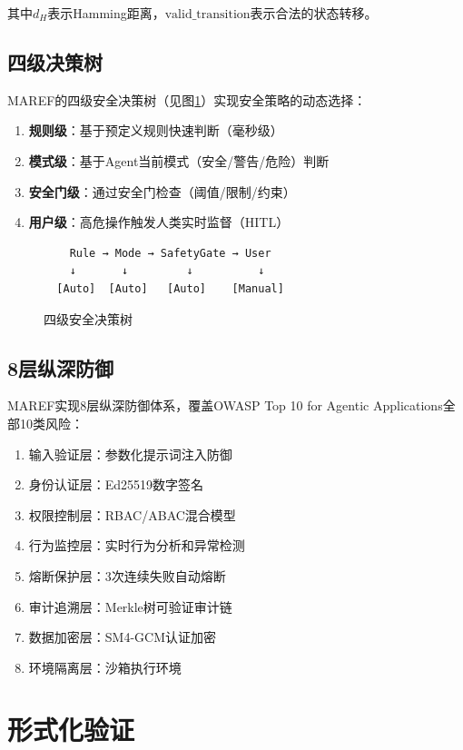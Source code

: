 其中$d_H$表示Hamming距离，$\text{valid\_transition}$表示合法的状态转移。

\subsection{四级决策树}

MAREF的四级安全决策树（见图\ref{fig:decision}）实现安全策略的动态选择：

\begin{enumerate}
    \item \textbf{规则级}：基于预定义规则快速判断（毫秒级）
    \item \textbf{模式级}：基于Agent当前模式（安全/警告/危险）判断
    \item \textbf{安全门级}：通过安全门检查（阈值/限制/约束）
    \item \textbf{用户级}：高危操作触发人类实时监督（HITL）
\end{enumerate}

\begin{figure}[htbp]
\centering
\begin{verbatim}
    Rule → Mode → SafetyGate → User
    ↓       ↓         ↓          ↓
  [Auto]  [Auto]   [Auto]    [Manual]
\end{verbatim}
\caption{四级安全决策树}
\label{fig:decision}
\end{figure}

\subsection{8层纵深防御}

MAREF实现8层纵深防御体系，覆盖OWASP Top 10 for Agentic Applications全部10类风险：

\begin{enumerate}
    \item 输入验证层：参数化提示词注入防御
    \item 身份认证层：Ed25519数字签名
    \item 权限控制层：RBAC/ABAC混合模型
    \item 行为监控层：实时行为分析和异常检测
    \item 熔断保护层：3次连续失败自动熔断
    \item 审计追溯层：Merkle树可验证审计链
    \item 数据加密层：SM4-GCM认证加密
    \item 环境隔离层：沙箱执行环境
\end{enumerate}

\section{形式化验证}


